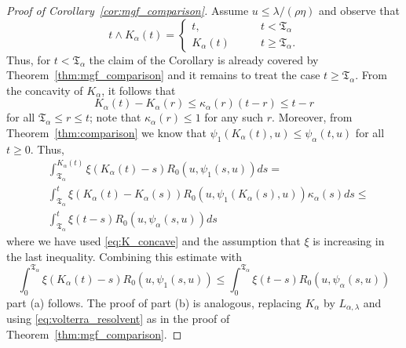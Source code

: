 \documentclass[12pt,a4paper]{amsart}
\numberwithin{equation}{section}
\numberwithin{equation}{section}
\theoremstyle{nonumberplain}
\begin{document}
\begin{proof}[Proof of Corollary~\ref{cor:mgf_comparison}]
Assume $u \le \lambda / (\rho \eta)$ and observe that
\[t \wedge K_\alpha(t) = \begin{cases} t, &\qquad t < \mathfrak{T}_\alpha\\ K_\alpha(t) &\qquad t \ge \mathfrak{T}_\alpha.\end{cases}\]
Thus, for $t < \mathfrak{T}_\alpha$ the claim of the Corollary is already covered by Theorem~\ref{thm:mgf_comparison} and it remains to treat the case $t \ge \mathfrak{T}_\alpha$. From the concavity of $K_\alpha$, it follows that
\begin{equation}\label{eq:K_concave}
K_\alpha(t) - K_\alpha(r) \le \kappa_\alpha(r) (t-r) \le t-r
\end{equation}
for all $\mathfrak{T}_\alpha \le r \le t$; note that $\kappa_\alpha(r) \le 1$ for any such $r$. Moreover, from Theorem~\ref{thm:comparison} we know that $\psi_1(K_\alpha(t),u) \le \psi_\alpha(t,u)$ for all $t \ge 0$. Thus,
\begin{align*}
&\int_{\mathfrak{T}_\alpha}^{K_\alpha(t)} \xi(K_\alpha(t) - s) R_0(u,\psi_1(s,u)) ds=  \\ &\int_{\mathfrak{T}_\alpha}^{t} \xi(K_\alpha(t) - K_\alpha(s)) R_0(u,\psi_1(K_\alpha(s),u)) \kappa_\alpha(s) ds \le \\
&\int_{\mathfrak{T}_\alpha}^{t} \xi(t - s) R_0(u,\psi_\alpha(s,u)) ds 
\end{align*}
where we have used \eqref{eq:K_concave} and the assumption that $\xi$ is increasing in the last inequality. Combining this estimate with 
\[\int_0^{\mathfrak{T}_\alpha} \xi(K_\alpha(t) - s) R_0(u,\psi_1(s,u)) \le \int_0^{\mathfrak{T}_\alpha} \xi(t - s) R_0(u,\psi_\alpha(s,u)) \]
part (a) follows. The proof of part (b) is analogous, replacing $K_\alpha$ by $L_{\alpha,\lambda}$ and using \eqref{eq:volterra_resolvent} as in the proof of Theorem~\ref{thm:mgf_comparison}.
\end{proof}

    
\end{document}
